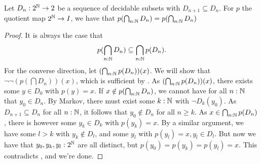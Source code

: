 %
%
%
%
%
%
%
%


\begin{lemma}
  Let $D_n:2^{\mathbb{N}} \to 2$ be a sequence of decidable subsets with $D_{n+1}\subseteq D_n$.
  For $p$ the quotient map $2^{\mathbb{N}} \to I$, we have that 
  $p(\bigcap_{n:\mathbb{N}} D_n) = p(\bigcap_{n:\mathbb{N}} D_n)$
\end{lemma}
\begin{proof}
  It is always the case that $$p(\bigcap_{n:\mathbb{N}} D_n) \subseteq \bigcap_{n:\mathbb{N}} p(D_n).$$
  For the converse direction, let $(\bigcap_{n:\mathbb{N}} p(D_n))(x)$. 
  We will show that $ \neg \neg (p(\bigcap D_n)) (x)$, which is sufficient by . 
%
  As $(\bigcap_{n:\mathbb{N}} p(D_n))(x)$, there exists some $y\in D_0$ with $p(y) = x$. 
%
  If $x\notin p(\bigcap_{n:\mathbb{N}} D_n)$, we cannot have for all $n:\mathbb{N}$ that $y_0 \in  D_n$. 
  By Markov, there must exist some $k:\mathbb{N}$ with $\neg D_k(y_0)$. 
  As $D_{n+1}\subseteq D_n$ for all $n:\mathbb{N}$, it follows that $y_0\notin D_n$ for all $n\geq k$. 
%
  As $x\in \bigcap_{n:\mathbb{N}}p(D_n)$, there is however some $y_k\in D_k$ with $p(y_k) = x$. 
  By a similar argument, we have some $l>k$ with $y_k\notin D_l$, and some $y_l$ with $p(y_l) = x, y_l \in D_l$. 
  But now we have that $y_0, y_k, y_l:2^{\mathbb{N}}$ are all distinct, but $p(y_0) = p(y_k) = p(y_l) = x$. 
  This contradicts , and we're done. 
\end{proof}


